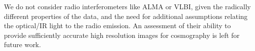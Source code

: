 \documentclass[a4paper,11pt]{article}
\begin{document}
{\begin{enumerate}
\end{enumerate}

We do not consider radio interferometers like ALMA or VLBI, given the
radically different properties of the data, and the need for
additional assumptions relating the optical/IR light to the radio
emission. An assessment of their ability to provide sufficiently
accurate high resolution images for cosmography is left for future
work.



}
\end{document}
